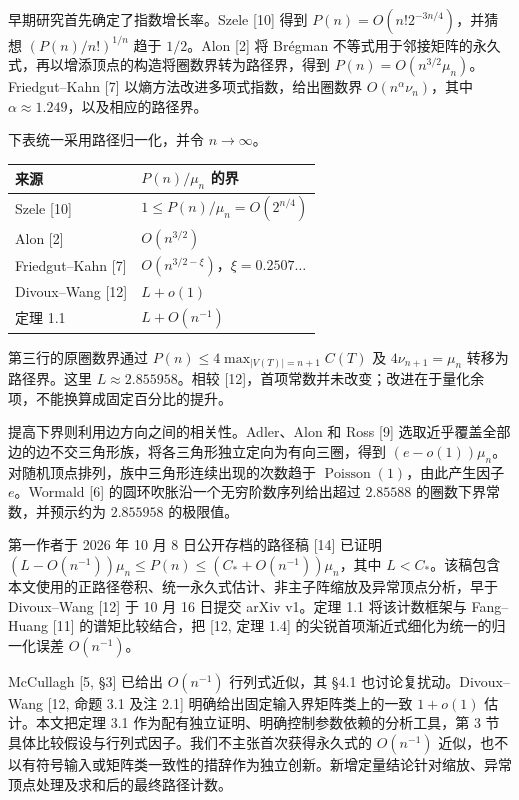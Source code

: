 \documentclass[11pt,a4paper]{article}
\begin{document}
早期研究首先确定了指数增长率。Szele {[}10{]} 得到 \(P(n)=O(n!2^{-3n/4})\)，并猜想 \((P(n)/n!)^{1/n}\) 趋于 \(1/2\)。Alon {[}2{]} 将 Brégman 不等式用于邻接矩阵的永久式，再以增添顶点的构造将圈数界转为路径界，得到 \(P(n)=O(n^{3/2}\mu_n)\)。Friedgut--Kahn {[}7{]} 以熵方法改进多项式指数，给出圈数界 \(O(n^\alpha\nu_n)\)，其中 \(\alpha\approx1.249\)，以及相应的路径界。


下表统一采用路径归一化，并令 \(n\to\infty\)。

\begin{longtable}[]{@{}ll@{}}
\toprule\noalign{}
来源 & \(P(n)/\mu_n\) 的界 \\
\midrule\noalign{}
\endhead
\bottomrule\noalign{}
\endlastfoot
Szele {[}10{]} & \(1\le P(n)/\mu_n=O(2^{n/4})\) \\
Alon {[}2{]} & \(O(n^{3/2})\) \\
Friedgut--Kahn {[}7{]} & \(O(n^{3/2-\xi})\)，\(\xi=0.2507\ldots\) \\
Divoux--Wang {[}12{]} & \(L+o(1)\) \\
定理 1.1 & \(L+O(n^{-1})\) \\
\end{longtable}

第三行的原圈数界通过 \(P(n)\le4\max_{|V(T)|=n+1}C(T)\) 及 \(4\nu_{n+1}=\mu_n\) 转移为路径界。这里 \(L\approx2.855958\)。相较 {[}12{]}，首项常数并未改变；改进在于量化余项，不能换算成固定百分比的提升。

提高下界则利用边方向之间的相关性。Adler、Alon 和 Ross {[}9{]} 选取近乎覆盖全部边的边不交三角形族，将各三角形独立定向为有向三圈，得到 \((e-o(1))\mu_n\)。对随机顶点排列，族中三角形连续出现的次数趋于 \(\operatorname{Poisson}(1)\)，由此产生因子 \(e\)。Wormald {[}6{]} 的圆环吹胀沿一个无穷阶数序列给出超过 \(2.85588\) 的圈数下界常数，并预示约为 \(2.855958\) 的极限值。

第一作者于 2026 年 10 月 8 日公开存档的路径稿 {[}14{]} 已证明 \((L-O(n^{-1}))\mu_n\le P(n)\le(C_*+O(n^{-1}))\mu_n\)，其中 \(L<C_*\)。该稿包含本文使用的正路径卷积、统一永久式估计、非主子阵缩放及异常顶点分析，早于 Divoux--Wang {[}12{]} 于 10 月 16 日提交 arXiv v1。定理 1.1 将该计数框架与 Fang--Huang {[}11{]} 的谱矩比较结合，把 {[}12, 定理 1.4{]} 的尖锐首项渐近式细化为统一的归一化误差 \(O(n^{-1})\)。

McCullagh {[}5, §3{]} 已给出 \(O(n^{-1})\) 行列式近似，其 §4.1 也讨论复扰动。Divoux--Wang {[}12, 命题 3.1 及注 2.1{]} 明确给出固定输入界矩阵类上的一致 \(1+o(1)\) 估计。本文把定理 3.1 作为配有独立证明、明确控制参数依赖的分析工具，第 3 节具体比较假设与行列式因子。我们不主张首次获得永久式的 \(O(n^{-1})\) 近似，也不以有符号输入或矩阵类一致性的措辞作为独立创新。新增定量结论针对缩放、异常顶点处理及求和后的最终路径计数。
\end{document}
